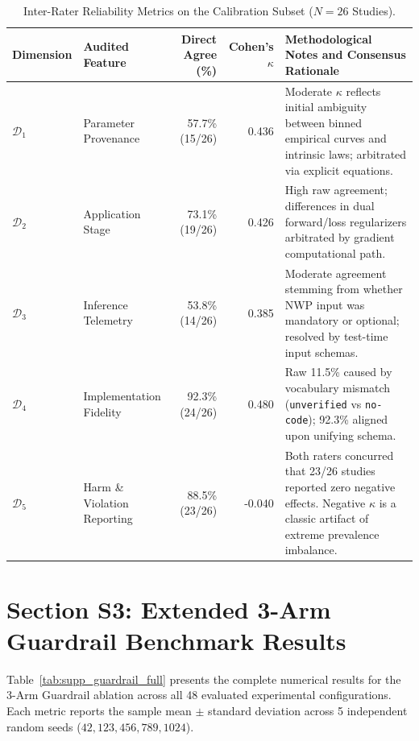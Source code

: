 \documentclass[3p,times]{elsarticle}
\begin{document}
\begin{table}[h]
\centering
\small
\caption{Inter-Rater Reliability Metrics on the Calibration Subset ($N=26$ Studies).}
\label{tab:supp_interrater}
\begin{tabularx}{\textwidth}{lp{3.5cm}rrp{6.0cm}}
\toprule
\textbf{Dimension} & \textbf{Audited Feature} & \textbf{Direct Agree (\%)} & \textbf{Cohen's $\kappa$} & \textbf{Methodological Notes and Consensus Rationale} \\
\midrule
$\mathcal{D}_1$ & Parameter Provenance & 57.7\% (15/26) & 0.436 & Moderate $\kappa$ reflects initial ambiguity between binned empirical curves and intrinsic laws; arbitrated via explicit equations. \\
$\mathcal{D}_2$ & Application Stage & 73.1\% (19/26) & 0.426 & High raw agreement; differences in dual forward/loss regularizers arbitrated by gradient computational path. \\
$\mathcal{D}_3$ & Inference Telemetry & 53.8\% (14/26) & 0.385 & Moderate agreement stemming from whether NWP input was mandatory or optional; resolved by test-time input schemas. \\
$\mathcal{D}_4$ & Implementation Fidelity & 92.3\% (24/26) & 0.480 & Raw 11.5\% caused by vocabulary mismatch (\texttt{unverified} vs \texttt{no-code}); 92.3\% aligned upon unifying schema. \\
$\mathcal{D}_5$ & Harm \& Violation Reporting & 88.5\% (23/26) & -0.040 & Both raters concurred that 23/26 studies reported zero negative effects. Negative $\kappa$ is a classic artifact of extreme prevalence imbalance. \\
\bottomrule
\end{tabularx}
\end{table}

\newpage
\section*{Section S3: Extended 3-Arm Guardrail Benchmark Results}

Table~\ref{tab:supp_guardrail_full} presents the complete numerical results for the 3-Arm Guardrail ablation across all 48 evaluated experimental configurations. Each metric reports the sample mean $\pm$ standard deviation across 5 independent random seeds ($42, 123, 456, 789, 1024$).
\end{document}
